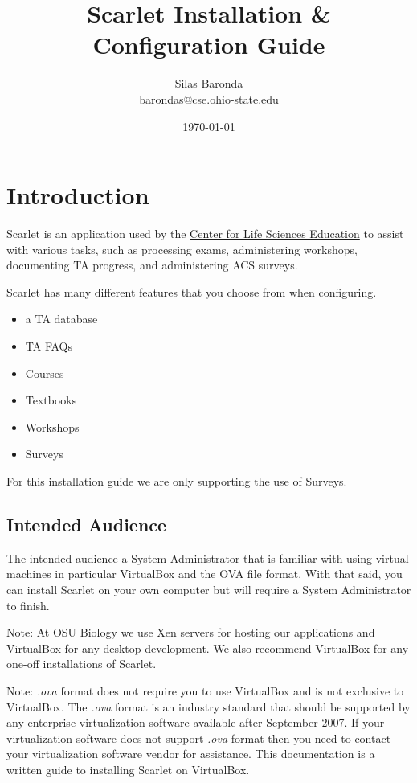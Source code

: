 \documentclass[pdftex,11pt,letterpaper]{article}
\begin{document}
\title{Scarlet Installation \& Configuration Guide}
\author{Silas Baronda\\\href{mailto:barondas@cse.ohio-state.edu}{barondas@cse.ohio-state.edu}}

\date{\today}
\maketitle

\tableofcontents
\newpage

\listoffigures
\newpage

\section{Introduction}

Scarlet is an application used by the \href{http://biology.osu.edu/}{Center for Life Sciences Education} to assist with various tasks, such as processing exams, administering workshops, documenting TA progress, and administering ACS surveys.

Scarlet has many different features that you choose from when configuring.

\begin{itemize}
\item a TA database
\item TA FAQs
\item Courses
\item Textbooks
\item Workshops
\item Surveys
\end{itemize}

For this installation guide we are only supporting the use of Surveys.

\subsection{Intended Audience}

The intended audience a System Administrator that is familiar with using virtual machines in particular VirtualBox and the OVA file format.  With that said, you can install Scarlet on your own computer but will require a System Administrator to finish.

Note:
At OSU Biology we use Xen servers for hosting our applications and VirtualBox for any desktop development.  We also recommend VirtualBox for any one-off installations of Scarlet.

Note:
\textit{.ova} format does not require you to use VirtualBox and is not exclusive to VirtualBox.  The \textit{.ova} format is an industry standard that should be supported by any enterprise virtualization software available after September 2007.  If your virtualization software does not support \textit{.ova} format then you need to contact your virtualization software vendor for assistance.  This documentation is a written guide to installing Scarlet on VirtualBox.
\end{document}
